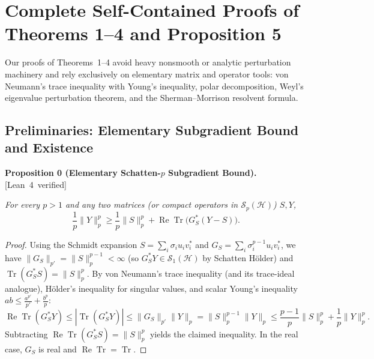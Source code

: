 \documentclass[10pt,letterpaper]{article}
\newcommand{\leanbadge}[1]{\mbox{\sffamily\scriptsize\color{leanborder}[#1]}}
\newcommand{\Hilb}{\mathcal{H}}
\newcommand{\Sp}{\mathcal{S}_p}
\newcommand{\Tr}{\operatorname{Tr}}
\begin{document}
\section{Complete Self-Contained Proofs of Theorems 1--4 and Proposition 5}

Our proofs of Theorems~1--4 avoid heavy nonsmooth or analytic perturbation machinery and rely exclusively on elementary matrix and operator tools: von Neumann's trace inequality with Young's inequality, polar decomposition, Weyl's eigenvalue perturbation theorem, and the Sherman--Morrison resolvent formula.

\subsection{Preliminaries: Elementary Subgradient Bound and Existence}

\begin{tcolorbox}[lemmabox]
\textbf{Proposition 0 (Elementary Schatten-$p$ Subgradient Bound).}\hfill\leanbadge{Lean~4 verified}\par\vspace{1.5pt}
\emph{For every $p > 1$ and any two matrices (or compact operators in $\Sp(\Hilb)$) $S, Y$,}
\[
  \frac{1}{p}\|Y\|_p^p \ge \frac{1}{p}\|S\|_p^p + \operatorname{Re}\Tr\bigl(G_S^*(Y - S)\bigr).
\]
\end{tcolorbox}

\begin{proof}
Using the Schmidt expansion $S = \sum_i \sigma_i u_i v_i^*$ and $G_S = \sum_i \sigma_i^{p-1} u_i v_i^*$, we have $\|G_S\|_{p'} = \|S\|_p^{p-1} < \infty$ (so $G_S^* Y \in \mathcal{S}_1(\Hilb)$ by Schatten H\"older) and $\Tr(G_S^* S) = \|S\|_p^p$. By von Neumann's trace inequality (and its trace-ideal analogue), H\"older's inequality for singular values, and scalar Young's inequality $ab \le \frac{a^{p'}}{p'} + \frac{b^p}{p}$:
\[
  \operatorname{Re}\Tr(G_S^* Y) \le |\Tr(G_S^* Y)| \le \|G_S\|_{p'}\|Y\|_p = \|S\|_p^{p-1}\|Y\|_p \le \frac{p-1}{p}\|S\|_p^p + \frac{1}{p}\|Y\|_p^p.
\]
Subtracting $\operatorname{Re}\Tr(G_S^* S) = \|S\|_p^p$ yields the claimed inequality. In the real case, $G_S$ is real and $\operatorname{Re}\Tr = \Tr$.
\end{proof}
\end{document}
